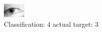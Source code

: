 \begin{figure}[h!]
\begin{center}
\includegraphics[width=0.60\columnwidth]{figures/ID1337_class_4_target_3.png}
\end{center}
\caption{ Classification: 4 actual target: 3}
\label{fig:ID1337_class_4_target_3}
\end{figure}
